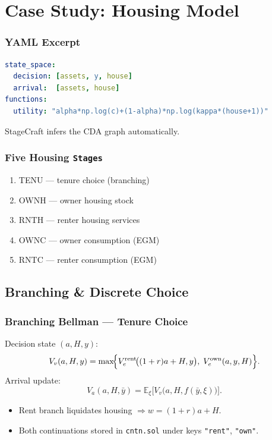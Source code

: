 \documentclass[10pt]{beamer}
\begin{document}
\section{Case Study: Housing Model}

\begin{frame}[fragile]
  \frametitle{YAML Excerpt}
\begin{lstlisting}[language=YAML]
state_space:
  decision: [assets, y, house]
  arrival:  [assets, house]
functions:
  utility: "alpha*np.log(c)+(1-alpha)*np.log(kappa*(house+1))"
\end{lstlisting}
  StageCraft infers the CDA graph automatically.
\end{frame}

\begin{frame}
  \frametitle{Five Housing \texttt{Stages}}
  \begin{enumerate}\itemsep2pt
    \item TENU  — tenure choice (branching)
    \item OWNH — owner housing stock
    \item RNTH — renter housing services
    \item OWNC — owner consumption (EGM)
    \item RNTC — renter consumption (EGM)
  \end{enumerate}
\end{frame}

\subsection{Branching \& Discrete Choice}

\begin{frame}
  \frametitle{Branching Bellman — Tenure Choice}
  Decision state $(a,H,y)$:
  \[
    V_v(a,H,y)=\max\!\Bigl\{
      V_e^{\text{rent}}\!\bigl((1+r)a+H,y\bigr),\;
      V_e^{\text{own}}(a,y,H)
    \Bigr\}.
  \]
  Arrival update:
  \[
    V_a(a,H,\bar y)=
      \mathbb E_{\xi}\bigl[V_v\bigl(a,H,f(\bar y,\xi)\bigr)\bigr].
  \]
  \begin{itemize}
    \item Rent branch liquidates housing $\Rightarrow w=(1+r)a+H$.
    \item Both continuations stored in \lstinline|cntn.sol| under keys
          \texttt{"rent"}, \texttt{"own"}.
  \end{itemize}
\end{frame}
\end{document}

